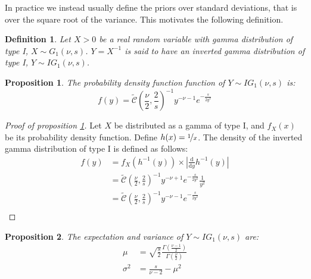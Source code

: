 \documentclass{amsart}
\theoremstyle{plain}
\newtheorem{proposition}{Proposition}[section]
\newtheorem{definition}{Definition}[section]
\theoremstyle{remark}
\numberwithin{equation}{section}
\begin{document}
In practice we instead usually define the priors over standard deviations, that is
over the square root of the variance. This motivates the following definition.\newline

\begin{definition}\label{InvertedGamma1}
  Let $X>0$ be a real random variable with gamma distribution of type I, $X\sim G_1\left(\nu,s\right)$. $Y = X^{-1}$ is said to have an inverted gamma distribution of type I, $Y\sim IG_1(\nu, s)$.
\end{definition}

\begin{proposition}\label{InvertedGamma1Density}
  The probability density function function of $Y\sim IG_1(\nu, s)$ is:
  \[
    f(y) = \widetilde{\mathcal C}\left(\frac{\nu}{2}, \frac{2}{s}\right)^{-1}y^{-\nu-1}e^{-\frac{s}{2 y^2}}
  \]
\end{proposition}

\begin{proof}[Proof of proposition \ref{InvertedGamma1Density}]
  Let $X$ be distributed as a gamma of type I, and $f_X(x)$ be its
  probability density function. Define $h(x) = \nicefrac{1}{x}$. The
  density of the inverted gamma distribution of type I is defined as
  follows:
  \[
    \begin{split}
      f(y) &= f_X\left(h^{-1}(y)\right) \times \left|\frac{\mathrm d}{\mathrm dy}h^{-1}(y)\right|\\
      &= \widetilde{\mathcal C}\left(\frac{\nu}{2}, \frac{2}{s}\right)^{-1}y^{-\nu+1}e^{-\frac{s}{2 y^2}}\frac{1}{y^2}\\
      &= \widetilde{\mathcal C}\left(\frac{\nu}{2}, \frac{2}{s}\right)^{-1}y^{-\nu-1}e^{-\frac{s}{2 y^2}}\\
    \end{split}
  \]
\end{proof}

\begin{proposition}\label{InvertedGamma1Moments}
  The expectation and variance of $Y\sim IG_1(\nu, s)$ are:
  \[
    \begin{split}
      \mu &= \sqrt{\frac{s}{2}}\frac{\Gamma\left(\frac{\nu-1}{2}\right)}{\Gamma\left(\frac{\nu}{2}\right)}\\
      \sigma^2 &= \frac{s}{\nu-2}-\mu^2
    \end{split}
  \]
\end{proposition}
\end{document}
